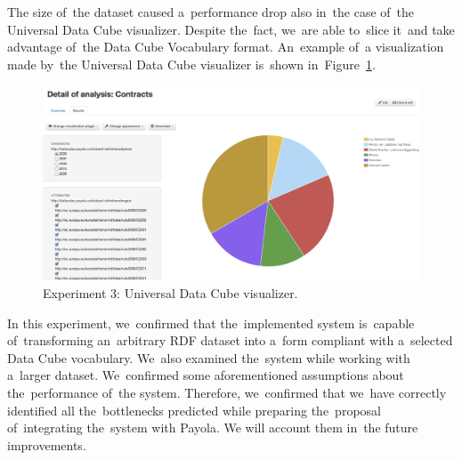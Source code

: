 The size of~the dataset caused a~performance drop also in~the case of~the
Universal Data Cube visualizer. Despite the~fact, we~are able to~slice it~and 
take advantage of~the Data Cube Vocabulary format. An~example of~a visualization 
made by~the Universal Data Cube visualizer is~shown in~Figure~\ref{fig:contracts-uni-dcv}.

\begin{figure}
  \centering
  \includegraphics[width=140mm]{img/contracts-uni-dcv.png}
  \caption{Experiment 3: Universal Data Cube visualizer.}
  \label{fig:contracts-uni-dcv}
\end{figure}

In this experiment, we~confirmed that the~implemented system is~capable of~transforming an~arbitrary RDF dataset into a~form compliant with a~selected Data 
Cube vocabulary. We~also examined the~system while working with a~larger 
dataset. We~confirmed some aforementioned assumptions about the~performance of~the system. Therefore, we~confirmed that we~have correctly identified all the~bottlenecks predicted while preparing the~proposal of~integrating the~system with Payola. 
We will account them in~the future improvements.

